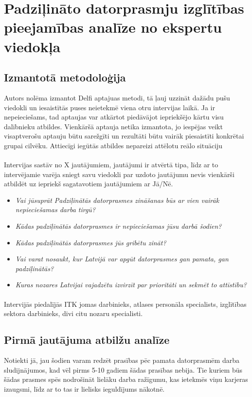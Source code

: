\section{Padziļināto datorprasmju izglītības pieejamības analīze no ekspertu viedokļa}
\subsection{Izmantotā metodoloģija}
Autors nolēma izmantot Delfi aptajuas metodi, tā ļauj uzzināt dažādu pušu viedokli un iesaistītās puses
neietekmē viena otru intervijas laikā. Ja ir nepeieciešams, tad aptaujas var atkārtot piedāvājot iepriekšējo
kārtu visu dalībnieku atbildes. Vienkāršā aptauja netika izmantota, jo iespējas veikt visaptverošu aptauju būtu sarežgīti
un rezultāti būtu vairāk piesaistīti konkrētai grupai cilvēku. Attiecīgi iegūtās atbildes nepareizi attēlotu reālo situāciju
\paragraph{}
Intervijas sastāv no X jautājumiem, jautājumi ir atvērtā tipa, līdz ar to intervējamie varēja sniegt savu viedokli par
uzdoto jautājumu nevis vienkārši atbildēt uz iepriekš sagatavotiem jautājumiem ar Jā/Nē.
\begin{itemize}
    \item \textit{Vai jūsuprāt Padziļinātās datorprasmes zināšanas būs ar vien vairāk nepieciešamas darba tirgū?}
    \item \textit{Kādas padziļinātās datorprasmes ir nepieciešamas jūsu darbā šodien?}
    \item \textit{Kādas padziļinātās datorprasmes jūs gribētu zināt?}
    \item \textit{Vai varat nosaukt, kur Latvijā var apgūt datorprasmes gan pamata, gan padziļinātās?}
    \item \textit{Kuras nozares Latvijai vajadzētu izvirzīt par prioritāti un sekmēt to attīstību?}
\end{itemize}
\paragraph{}
Intervijās piedalījās ITK jomas darbinieks, atlases personāla specialists, izglītības sektora darbinieks,
divi citu nozaru specialisti.
\subsection{Pirmā jautājuma atbilžu analīze}
Notiekti jā, jau šodien varam redzēt prasības pēc pamata datorprasmēm darba sludijnājumos, kad vēl pirms 5-10 gadiem
šādas prasības nebija.
Tie kuriem būs šādas prasmes spēs nodrošināt lielāku darba ražīgumu, kas ietekmēs viņu karjeras izaugsmi, līdz ar to 
tas ir lielisks ieguldījums nākotnē.
